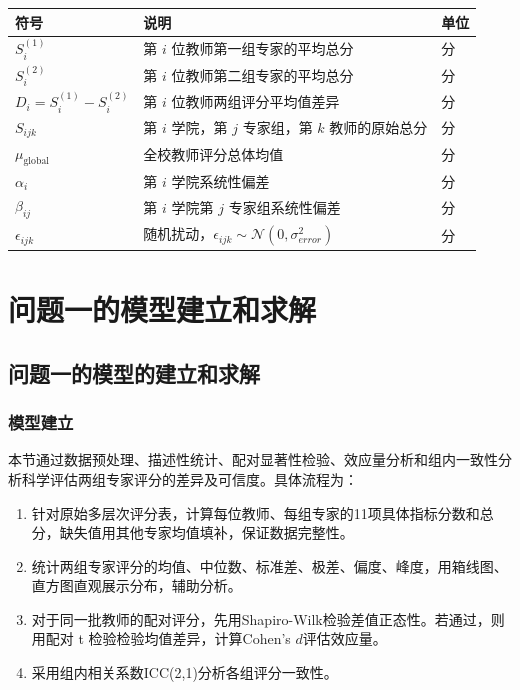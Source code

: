 \documentclass[withoutpreface,bwprint]{cumcmthesis}
\begin{document}
\begin{table}[H]
\centering
\begin{tabularx}{\textwidth}{>{\raggedright\arraybackslash}m{3cm} >{\centering\arraybackslash}X >{\centering\arraybackslash}m{2cm}}
\toprule
\textbf{符号}    & \textbf{说明}    & \textbf{单位} \\
\midrule
$S^{(1)}_i$                    & 第 $i$ 位教师第一组专家的平均总分        & 分 \\
$S^{(2)}_i$                    & 第 $i$ 位教师第二组专家的平均总分        & 分 \\
$D_i = S^{(1)}_i - S^{(2)}_i$  & 第 $i$ 位教师两组评分平均值差异          & 分 \\
$S_{ijk}$                      & 第 $i$ 学院，第 $j$ 专家组，第 $k$ 教师的原始总分 & 分 \\
$\mu_\text{global}$            & 全校教师评分总体均值                      & 分 \\
$\alpha_i$                     & 第 $i$ 学院系统性偏差                    & 分 \\
$\beta_{ij}$                   & 第 $i$ 学院第 $j$ 专家组系统性偏差       & 分 \\
$\epsilon_{ijk}$               & 随机扰动，$\epsilon_{ijk} \sim \mathcal{N}(0, \sigma_{error}^2)$ & 分 \\
\bottomrule
\end{tabularx}
\label{tab:符号说明}
\end{table}



\section{问题一的模型建立和求解}

\subsection{问题一的模型的建立和求解}
\subsubsection{模型建立}
本节通过数据预处理、描述性统计、配对显著性检验、效应量分析和组内一致性分析科学评估两组专家评分的差异及可信度。具体流程为：
\begin{enumerate}
    \item 针对原始多层次评分表，计算每位教师、每组专家的11项具体指标分数和总分，缺失值用其他专家均值填补，保证数据完整性。
    \item 统计两组专家评分的均值、中位数、标准差、极差、偏度、峰度，用箱线图、直方图直观展示分布，辅助分析。
    \item 对于同一批教师的配对评分，先用Shapiro-Wilk检验差值正态性。若通过，则用配对 t 检验检验均值差异，计算Cohen's $d$评估效应量。
    \item 采用组内相关系数ICC(2,1)分析各组评分一致性。
\end{enumerate}
\end{document}
